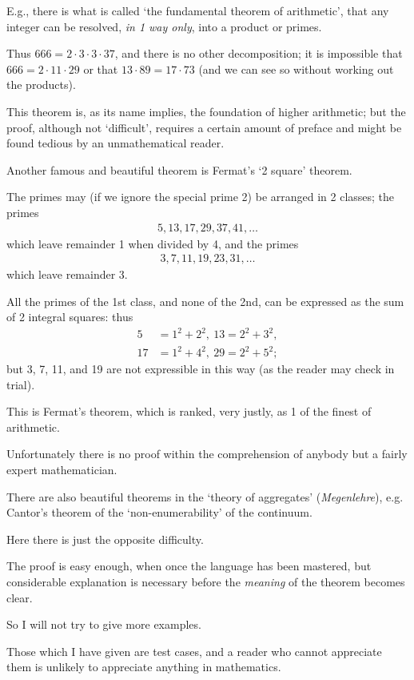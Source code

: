 \documentclass{article}
\numberwithin{equation}{section}
\begin{document}
E.g., there is what is called `the fundamental theorem of arithmetic', that any integer can be resolved, \textit{in 1 way only}, into a product or primes.

Thus $666 = 2\cdot3\cdot3\cdot37$, and there is no other decomposition; it is impossible that $666 = 2\cdot11\cdot29$ or that $13\cdot89 = 17\cdot73$ (and we can see so without working out the products).

This theorem is, as its name implies, the foundation of higher arithmetic; but the proof, although not `difficult', requires a certain amount of preface and might be found tedious by an unmathematical reader.

%
Another famous and beautiful theorem is Fermat's `2 square' theorem.

The primes may (if we ignore the special prime 2) be arranged in 2 classes; the primes
\begin{align*}
    5,13,17,29,37,41,\ldots
\end{align*}
which leave remainder 1 when divided by 4, and the primes
\begin{align*}
    3,7,11,19,23,31,\ldots
\end{align*}
which leave remainder 3.

All the primes of the 1st class, and none of the 2nd, can be expressed as the sum of 2 integral squares: thus
\begin{align*}
    5 &= 1^2 + 2^2,\ 13 = 2^2 + 3^2,\\
    17 &= 1^2 + 4^2,\ 29 = 2^2 + 5^2;
\end{align*}
but 3, 7, 11, and 19 are not expressible in this way (as the reader may check in trial).

This is Fermat's theorem, which is ranked, very justly, as 1 of the finest of arithmetic.

Unfortunately there is no proof within the comprehension of anybody but a fairly expert mathematician.

%
There are also beautiful theorems in the `theory of aggregates' (\textit{Megenlehre}), e.g. Cantor's theorem of the `non-enumerability' of the continuum.

Here there is just the opposite difficulty.

The proof is easy enough, when once the language has been mastered, but considerable explanation is necessary before the \textit{meaning} of the theorem becomes clear.

So I will not try to give more examples.

Those which I have given are test cases, and a reader who cannot appreciate them is unlikely to appreciate anything in mathematics.
\end{document}
